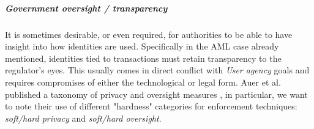 \subparagraph{Government oversight / transparency} It is sometimes desirable, or even required, for authorities to be able to have insight into how identities are used. Specifically in the AML case already mentioned, identities tied to transactions must retain transparency to the regulator's eyes. This usually comes in direct conflict with \emph{User agency} goals and requires compromises of either the technological or legal form. Auer et al. published a taxonomy of privacy and oversight measures \cite{ABCD25}, in particular, we want to note their use of different "hardness" categories for enforcement techniques: \emph{soft/hard privacy} and \emph{soft/hard oversight}.
